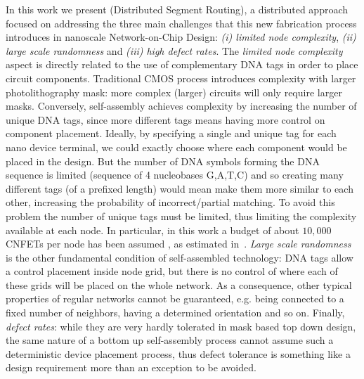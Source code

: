 In this work we present \disr{} (Distributed Segment Routing), a distributed
approach focused on addressing the three main challenges that this new fabrication process introduces
in nanoscale Network-on-Chip Design: \emph{(i) limited node complexity}, \emph{(ii) large scale
randomness} and \emph{(iii) high defect rates}.  
The \emph{limited node complexity} aspect is directly
related to the use of complementary DNA tags in order to place circuit
components. Traditional CMOS process introduces complexity 
with larger photolithography mask: more complex (larger) circuits
will only require larger masks. Conversely, self-assembly achieves
complexity by increasing the number of unique DNA tags, since more
different tags means having more control on component placement. Ideally, by specifying a single
and unique tag for each nano device terminal, we could exactly
choose where each component would be placed in the design. But the number of DNA
symbols forming the DNA sequence is limited (sequence of 4 nucleobases
G,A,T,C) and so creating many different tags (of a prefixed length) would
mean make them more similar to each other, increasing the probability
of incorrect/partial matching. To avoid this problem 
the number of unique tags must be limited, thus limiting the
complexity available at each node.
In particular, in this work a budget of about $10,000$ CNFETs per node
has been assumed , as estimated in~\cite{liu_jetcs}.
\emph{Large scale randomness} is the other fundamental condition of
self-assembled technology: DNA tags allow a control placement inside
node grid, but there is no control of where each of these  grids will
be placed on the whole network. As a consequence, other typical
properties of regular networks cannot be guaranteed, e.g. being
connected to a fixed number of neighbors, having a determined
orientation and so on.
Finally, \emph{defect rates}: while they are very hardly tolerated in mask
based top down design, the same nature of a bottom up self-assembly
 process cannot assume such a deterministic device placement
process, thus defect tolerance is something like a design requirement
more than an exception to be avoided.

